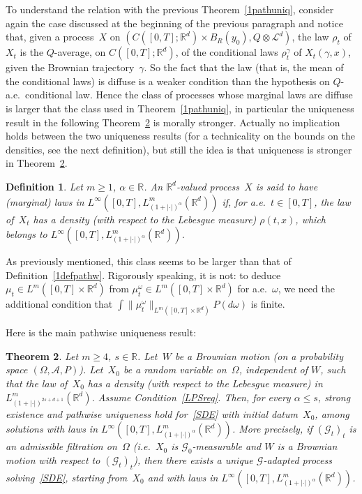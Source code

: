 \documentclass[a4paper,10pt]{article}
\newtheorem{theorem}{Theorem}[section]
\newtheorem{definition}[theorem]{Definition}
\newcommand\1{\mathbbm{1}}
\newcommand{\mr}{\mathbb{R}}
\newcommand{\mc}{\mathcal}
\numberwithin{equation}{section}
\begin{document}
To understand the relation with the previous Theorem~\ref{1pathuniq}, consider again the case discussed at the beginning of the previous paragraph and notice that, given a process~$X$ on $(C([0,T];\mr^d)\times B_R(y_0),Q\otimes\mc{L}^d)$, the law $\rho_t$ of~$X_t$ is the $Q$-average, on $C([0,T];\mr^d)$, of the conditional laws $\rho^\gamma_t$ of $X_t(\gamma,x)$, given the Brownian trajectory~$\gamma$. So the fact that the law (that is, the mean of the conditional laws) is diffuse is a weaker condition than the hypothesis on $Q$-a.e.~conditional law. Hence the class of processes whose marginal laws are diffuse is larger that the class used in Theorem~\ref{1pathuniq}, in particular the uniqueness result in the following Theorem~\ref{2pathwise} is morally stronger. Actually no implication holds between the two uniqueness results (for a technicality on the bounds on the densities, see the next definition), but still the idea is that uniqueness is stronger in Theorem~\ref{2pathwise}.

\begin{definition}
Let $m \geq 1$, $\alpha\in\mr$. An $\mr^d$-valued process~$X$ is said to have \emph{\textup{(}marginal\textup{)} laws in $L^\infty([0,T],L^m_{(1+|\cdot|)^{\alpha}}(\mr^d))$} if, for a.e.~$t \in [0,T]$, the law of~$X_t$ has a density \textup{(}with respect to the Lebesgue measure\textup{)} $\rho(t,x)$, which belongs to $L^\infty([0,T],L^m_{(1+|\cdot|)^{\alpha}}(\mr^d))$.
\end{definition}

As previously mentioned, this class seems to be larger than that of Definition~\ref{1defpathw}. Rigorously speaking, it is not: to deduce $\mu_t\in L^m([0,T]\times\mr^d)$ from $\mu^\omega_t\in L^m([0,T]\times\mr^d)$ for a.e.~$\omega$, we need the additional condition that $\int\|\mu_t^\omega\|_{L^m([0,T]\times\mr^d)}P(d\omega)$ is finite.

Here is the main pathwise uniqueness result:

\begin{theorem}\label{2pathwise}
Let $m\ge4$, $s\in\mr$. Let~$W$ be a Brownian motion \textup{(}on a probability space $(\Omega,\mc{A},P)$\textup{)}. Let~$X_0$ be a random variable on~$\Omega$, independent of $W$, such that the law of~$X_0$ has a density \textup{(}with respect to the Lebesgue measure\textup{)} in $L^m_{(1+|\cdot|)^{2s+d+1}}(\mr^d)$. Assume Condition~\ref{LPSreg}. Then, for every $\alpha\le s$, strong existence and pathwise uniqueness hold for~\eqref{SDE} with initial datum~$X_0$, among solutions with laws in $L^\infty([0,T],L^m_{(1+|\cdot|)^{\alpha}}(\mr^d))$. More precisely, if $(\mc{G}_t)_t$ is an admissible filtration on~$\Omega$ \textup{(}i.e.~$X_0$ is $\mc{G}_0$-measurable and $W$ is a Brownian motion with respect to $(\mc{G}_t)_t$\textup{)}, then there exists a unique $\mc{G}$-adapted process solving~\eqref{SDE}, starting from~$X_0$ and with laws in $L^\infty([0,T],L^m_{(1+|\cdot|)^{\alpha}}(\mr^d))$. 
\end{theorem}
\end{document}
